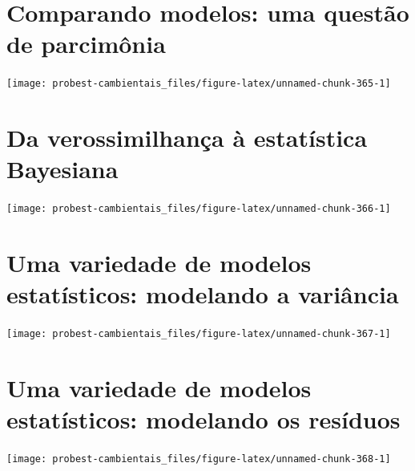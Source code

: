 \documentclass[
]{book}
\begin{document}
\hypertarget{aic}{%
\chapter{Comparando modelos: uma questão de parcimônia}\label{aic}}

\begin{center}\texttt{[image: probest-cambientais\_files/figure-latex/unnamed-chunk-365-1]} \end{center}

\hypertarget{statbayes}{%
\chapter{Da verossimilhança à estatística Bayesiana}\label{statbayes}}

\begin{center}\texttt{[image: probest-cambientais\_files/figure-latex/unnamed-chunk-366-1]} \end{center}

\hypertarget{varmodels}{%
\chapter{Uma variedade de modelos estatísticos: modelando a variância}\label{varmodels}}

\begin{center}\texttt{[image: probest-cambientais\_files/figure-latex/unnamed-chunk-367-1]} \end{center}

\hypertarget{nindep}{%
\chapter{Uma variedade de modelos estatísticos: modelando os resíduos}\label{nindep}}

\begin{center}\texttt{[image: probest-cambientais\_files/figure-latex/unnamed-chunk-368-1]} \end{center}

  
\end{document}
